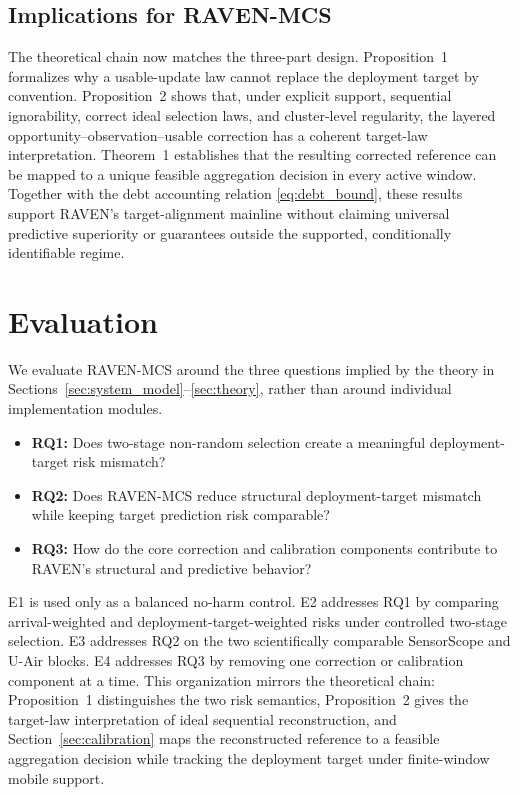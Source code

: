 \documentclass[letterpaper,journal]{IEEEtran}
\begin{document}
\subsection{Implications for RAVEN-MCS}
\label{subsec:theory_implications}

The theoretical chain now matches the three-part design.  Proposition~1
formalizes why a usable-update law cannot replace the deployment target by
convention.  Proposition~2 shows that, under explicit support, sequential
ignorability, correct ideal selection laws, and cluster-level regularity, the
layered opportunity--observation--usable correction has a coherent target-law
interpretation.  Theorem~1 establishes that the resulting corrected reference
can be mapped to a unique feasible aggregation decision in every active window.
Together with the debt accounting relation
\eqref{eq:debt_bound}, these results support RAVEN's target-alignment mainline
without claiming universal predictive superiority or guarantees outside the
supported, conditionally identifiable regime.




\section{Evaluation}
\label{sec:evaluation}

We evaluate RAVEN-MCS around the three questions implied by the theory in
Sections~\ref{sec:system_model}--\ref{sec:theory}, rather than around individual
implementation modules.

\begin{itemize}
    \item \textbf{RQ1:} Does two-stage non-random selection create a meaningful
    deployment-target risk mismatch?
    \item \textbf{RQ2:} Does RAVEN-MCS reduce structural deployment-target
    mismatch while keeping target prediction risk comparable?
    \item \textbf{RQ3:} How do the core correction and calibration components
    contribute to RAVEN's structural and predictive behavior?
\end{itemize}

E1 is used only as a balanced no-harm control.  E2 addresses RQ1 by comparing
arrival-weighted and deployment-target-weighted risks under controlled
two-stage selection.  E3 addresses RQ2 on the two scientifically comparable
SensorScope and U-Air blocks.  E4 addresses RQ3 by removing one correction or
calibration component at a time.  This organization mirrors the theoretical
chain: Proposition~1 distinguishes the two risk semantics, Proposition~2 gives
the target-law interpretation of ideal sequential reconstruction, and
Section~\ref{sec:calibration} maps the reconstructed reference to a feasible
aggregation decision while tracking the deployment target under finite-window
mobile support.
\end{document}
